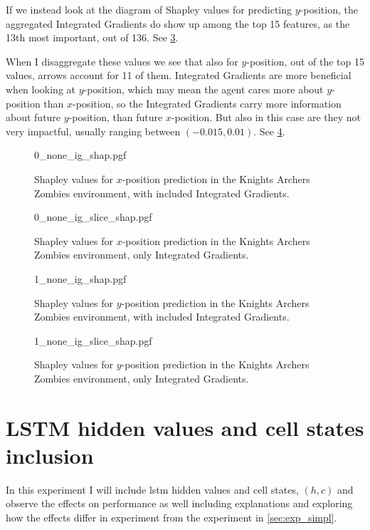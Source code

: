 \documentclass[UKenglish]{uiomasterthesis}
\begin{document}
If we instead look at the diagram of Shapley values for predicting $y$-position, the aggregated Integrated Gradients do show up among the top 15 features, as the 13th most important, out of 136. See \cref{fig:state_archer_ig_shap_1}.

When I disaggregate these values we see that also for $y$-position, out of the top 15 values, arrows account for 11 of them. Integrated Gradients are more beneficial when looking at $y$-position, which may mean the agent cares more about $y$-position than $x$-position, so the Integrated Gradients carry more information about future $y$-position, than future $x$-position. But also in this case are they not very impactful, usually ranging between $(-0.015,0.01)$. See \cref{fig:state_archer_ig_slice_shap_1}.

\begin{figure}[hbtp]
\centering
{0_none_ig_shap.pgf}
\caption{Shapley values for $x$-position prediction in the Knights Archers Zombies environment, with included Integrated Gradients.}
\label{fig:state_archer_ig_shap_0}
\end{figure}

\begin{figure}[hbtp]
\centering
{0_none_ig_slice_shap.pgf}
\caption{Shapley values for $x$-position prediction in the Knights Archers Zombies environment, only Integrated Gradients.}
\label{fig:state_archer_ig_slice_0}
\end{figure}

\begin{figure}[hbtp]
\centering
{1_none_ig_shap.pgf}
\caption{Shapley values for $y$-position prediction in the Knights Archers Zombies environment, with included Integrated Gradients.}
\label{fig:state_archer_ig_shap_1}
\end{figure}

\begin{figure}[hbtp]
\centering
{1_none_ig_slice_shap.pgf}
\caption{Shapley values for $y$-position prediction in the Knights Archers Zombies environment, only Integrated Gradients.}
\label{fig:state_archer_ig_slice_shap_1}
\end{figure}


\section{LSTM hidden values and cell states inclusion}
\label{sec:exp_lstm}
In this experiment I will include \ac{lstm} hidden values and cell states, $(h,c)$ and observe the effects on performance as well including explanations and exploring how the effects differ in experiment from the experiment in \cref{sec:exp_simpl}.
\end{document}
